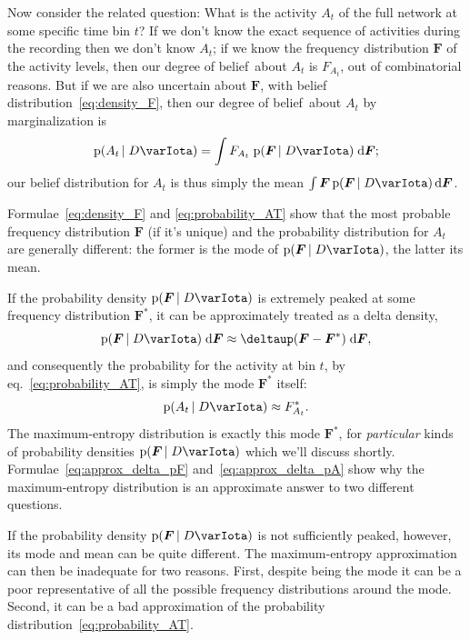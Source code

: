 \documentclass[\ifafour a4paper,12pt,\else a5paper,10pt,\fi%
onecolumn,oneside,article,%
british%
]{memoir}
\theoremstyle{remark}
\theoremstyle{innote}
\newcommand*{\delt}{\deltaup}%
\newcommand*{\di}{\mathrm{d}}%
\newcommand*{\pf}{\mathrm{p}}%
\renewcommand*{\|}[1][]{\nonscript\,#1\vert\nonscript\;\mathopen{}}
\newcommand*{\eqn}{eq.}%
\newcommand*{\dob}{degree of belief}
\newcommand*{\yAv}{A}
\newcommand*{\yFF}{F}
\newcommand*{\yF}{\bm{\yFF}}
\newcommand*{\yFFm}{\yFF^{*}}
\newcommand*{\yFm}{\yF^{*}}
\newcommand*{\yA}{\yAv}%
\newcommand*{\yI}{\varIota}
\newcommand*{\yD}{D}
\begin{document}
Now consider the related question: What is the activity $\yA_{t}$ of the
full network at some specific time bin $t$? If we don't know the exact
sequence of activities during the recording then we don't know $\yA_{t}$;
if we know the frequency distribution $\yF$ of the activity levels, then
our \dob\ about $\yA_{t}$ is $\yFF_{\yA_{t}}$, out of combinatorial
reasons. But if we are also uncertain about $\yF$, with
belief distribution~\eqref{eq:density_F}, then our \dob\ about $\yA_{t}$ by
marginalization is
\begin{equation}
  \label{eq:probability_AT}
  \pf(\yA_{t} \| \yD \yI) =
  \int \yFF_{\yA_{t}}\;   \pf(\yF \| \yD \yI)\;\di\yF;
\end{equation}
our belief distribution for $\yA_{t}$ is thus simply the mean
$\int \yF\, \pf(\yF \| \yD \yI)\,\di\yF$.

Formulae~\eqref{eq:density_F} and \eqref{eq:probability_AT} show that the
most probable frequency distribution $\yF$ (if it's unique) and the
probability distribution for $\yA_{t}$ are generally different: the former
is the mode of $\pf(\yF \| \yD \yI)$, the latter its mean.

If the probability density $\pf(\yF \| \yD \yI)$ is extremely peaked at some
frequency distribution $\yFm$, it can be approximately treated as a delta
density,
\begin{equation}
  \label{eq:approx_delta_pF}
  \pf(\yF \| \yD \yI)\;\di\yF \approx \delt(\yF-\yFm)\;\di\yF,
\end{equation}
and consequently the probability for the activity at bin $t$, by
\eqn~\eqref{eq:probability_AT}, is simply the mode $\yFm$ itself:
\begin{equation}
  \label{eq:approx_delta_pA}
  \pf(\yA_{t} \| \yD \yI) \approx \yFFm_{\yA_{t}}.
\end{equation}
The maximum-entropy distribution is exactly this mode $\yFm$, for
\emph{particular} kinds of probability densities $\pf(\yF \| \yD \yI)$
which we'll discuss shortly. Formulae~\eqref{eq:approx_delta_pF}
and~\eqref{eq:approx_delta_pA} show why the maximum-entropy distribution is
an approximate answer to two different questions.

If the probability density $\pf(\yF \| \yD \yI)$ is not sufficiently
peaked, however, its mode and mean can be quite different. The
maximum-entropy approximation can then be inadequate for two reasons.
First, despite being the mode it can be a poor representative of all the
possible frequency distributions around the mode. Second, it can be a bad
approximation of the probability distribution~\eqref{eq:probability_AT}.
\end{document}
